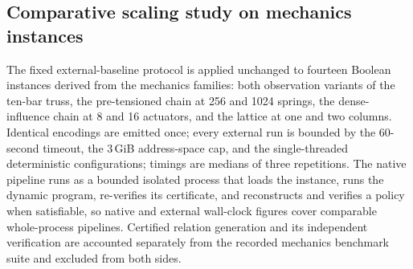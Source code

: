 \documentclass[11pt]{article}
\theoremstyle{plain}
\theoremstyle{definition}
\theoremstyle{remark}
\begin{document}
\subsection{Comparative scaling study on mechanics instances}
\label{subsec:mechanics-baselines}

The fixed external-baseline protocol is applied unchanged to fourteen
Boolean instances derived from the mechanics families: both observation
variants of the ten-bar truss, the pre-tensioned chain at 256 and 1024
springs, the dense-influence chain at 8 and 16 actuators, and the lattice at
one and two columns.  Identical encodings are emitted once; every external
run is bounded by the 60-second timeout, the 3\,GiB address-space cap, and
the single-threaded deterministic configurations; timings are medians of
three repetitions.  The native pipeline runs as a bounded isolated process
that loads the instance, runs the dynamic program, re-verifies its
certificate, and reconstructs and verifies a policy when satisfiable, so
native and external wall-clock figures cover comparable whole-process
pipelines.  Certified relation generation and its independent verification
are accounted separately from the recorded mechanics benchmark suite and
excluded from both sides.
\end{document}
